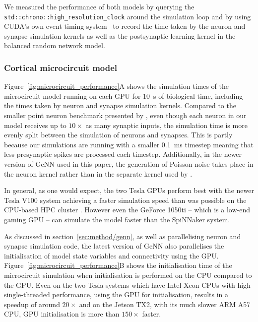 \documentclass[utf8]{frontiersSCNS} %
\begin{document}
We measured the performance of both models by querying the \lstinline{std::chrono::high_resolution_clock} around the simulation loop and by using CUDA's own event timing system~\citep[Section~3.2.5.6.2]{NVIDIACorporation2018} to record the time taken by the neuron and synapse simulation kernels as well as the postsynaptic learning kernel in the balanced random network model.

\subsubsection{Cortical microcircuit model}
\label{sec:results/performance/microcircuit}
Figure~\ref{fig:microcircuit_performance}A shows the simulation times of the microcircuit model running on each GPU for \SI{10}{\second} of biological time, including the times taken by neuron and synapse simulation kernels.
Compared to the smaller point neuron benchmark presented by \citet{Yavuz2016}, even though each neuron in our model receives up to $10\times$ as many synaptic inputs, the simulation time is more evenly split between the simulation of neurons and synapses.
This is partly because our simulations are running with a smaller \SI{0.1}{\milli\second} timestep meaning that less presynaptic spikes are processed each timestep.
Additionally, in the newer version of GeNN used in this paper, the generation of Poisson noise takes place in the neuron kernel rather than in the separate kernel used by \citet{Yavuz2016}.

In general, as one would expect, the two Tesla GPUs perform best with the newer Tesla V100 system achieving a faster simulation speed than was possible on the CPU-based HPC cluster \citep{VanAlbada2018}.
However even the GeForce 1050ti -- which is a low-end gaming GPU -- can simulate the model faster than the SpiNNaker system.

As discussed in section~\ref{sec:method/genn}, as well as parallelising neuron and synapse simulation code, the latest version of GeNN also parallelises the initialisation of model state variables and connectivity using the GPU.
Figure~\ref{fig:microcircuit_performance}B shows the initialisation time of the microcircuit simulation when initialisation is performed on the CPU compared to the GPU.
Even on the two Tesla systems which have Intel Xeon CPUs with high single-threaded performance, using the GPU for initialisation, results in a speedup of around $20\times$ and on the Jetson TX2, with its much slower ARM A57 CPU, GPU initialisation is more than $150\times$ faster.
\end{document}
